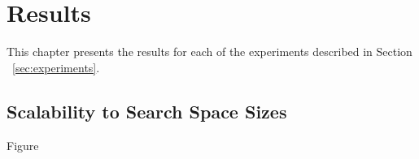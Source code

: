 \chapter{Results}
\label{cha:results}


% 
% 






This chapter presents the results for each of the experiments described in Section ~\ref{sec:experiments}.

\section{Scalability to Search Space Sizes}

Figure 


